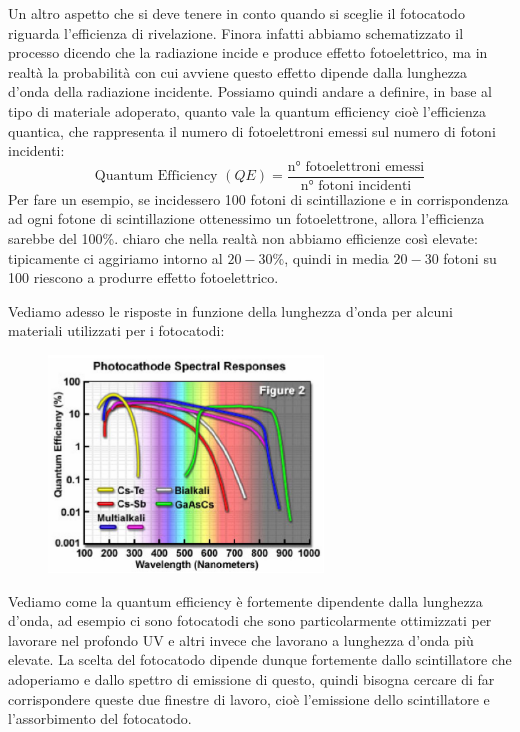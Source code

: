 Un altro aspetto che si deve tenere in conto quando si sceglie il fotocatodo riguarda l'efficienza di rivelazione. Finora infatti abbiamo schematizzato il processo dicendo che la radiazione incide e produce effetto fotoelettrico, ma in realtà la probabilità con cui avviene questo effetto dipende dalla lunghezza d'onda della radiazione incidente. Possiamo quindi andare a definire, in base al tipo di materiale adoperato, quanto vale la quantum efficiency cioè l'efficienza quantica, che rappresenta il numero di fotoelettroni emessi sul numero di fotoni incidenti:
\begin{equation*}
   \text{Quantum Efficiency }(QE)
   =\frac{\text{n° fotoelettroni emessi}}{\text{n° fotoni incidenti}}
\end{equation*}
Per fare un esempio, se incidessero 100 fotoni di scintillazione e in corrispondenza ad ogni fotone di scintillazione ottenessimo un fotoelettrone, allora l'efficienza sarebbe del 100\%. \E chiaro che nella realtà non abbiamo efficienze così elevate: tipicamente ci aggiriamo intorno al $20-30\%$, quindi in media $20-30$ fotoni su 100 riescono a produrre effetto fotoelettrico.

Vediamo adesso le risposte in funzione della lunghezza d'onda per alcuni materiali utilizzati per i fotocatodi:
\begin{figure}[H]
   \centering
   \includegraphics[width=0.65\textwidth]{immagini/efficienza_quantica.png}
\end{figure}
Vediamo come la quantum efficiency è fortemente dipendente dalla lunghezza d'onda, ad esempio ci sono fotocatodi che sono particolarmente ottimizzati per lavorare nel profondo UV e altri invece che lavorano a lunghezza d'onda più elevate. La scelta del fotocatodo dipende dunque fortemente dallo scintillatore che adoperiamo e dallo spettro di emissione di questo, quindi bisogna cercare di far corrispondere queste due finestre di lavoro, cioè l'emissione dello scintillatore e l'assorbimento del fotocatodo.

